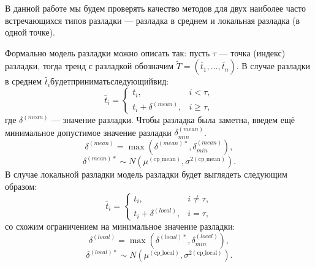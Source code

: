 \documentclass[%
12pt,
master,  %
natbib,      %
subf,        %
substylefile = spbu.rtx,
href,        %
colorlinks,  %
]{disser}
\begin{document}
В данной работе мы будем проверять качество методов для двух наиболее часто встречающихся типов разладки --- разладка в среднем и локальная разладка (в одной точке).

Формально модель разладки можно описать так: пусть $\tau$ --- точка (индекс) разладки, тогда тренд с разладкой обозначим $ \tilde{T} = (\tilde{t_1}, \dots, \tilde{t_n}) $. В случае разладки в среднем $\tilde{t_i} будет принимать следующий вид:$
\begin{equation*}
\tilde{t_i} =
	\begin{cases}
		t_i, & i < \tau, \\
		t_i + \delta^{(mean)}, & i \geqslant \tau,
	\end{cases}
\end{equation*}
где $ \delta^{(mean)} $  --- значение разладки. Чтобы разладка была заметна, введем ещё минимальное допустимое значение разладки $\delta_{min}^{(mean)}$.
\begin{equation*}
\delta^{(mean)} = \max(\delta^{(mean)*}, \delta_{min}^{(mean)} ),
\end{equation*}
\begin{equation*}
\delta^{(mean)*} \sim N(\mu^{\mathrm{(cp\_mean)}}, \sigma^{2\mathrm{(cp\_mean)}}).
\end{equation*}
В случае локальной разладки модель разладки будет выглядеть следующим образом:
\begin{equation*}
\tilde{t_i} =
	\begin{cases}
		t_i, & i \neq \tau, \\
		t_i + \delta^{(local)}, & i = \tau,
	\end{cases}
\end{equation*}
со схожим ограничением на минимальное значение разладки:
\begin{equation*}
\delta^{(local)} = \max(\delta^{(local)*}, \delta_{min}^{(local)} ),
\end{equation*}
\begin{equation*}
\delta^{(local)*} \sim N(\mu^{\mathrm{(cp\_local)}}, \sigma^{2\mathrm{(cp\_local)}}).
\end{equation*}
\end{document}
